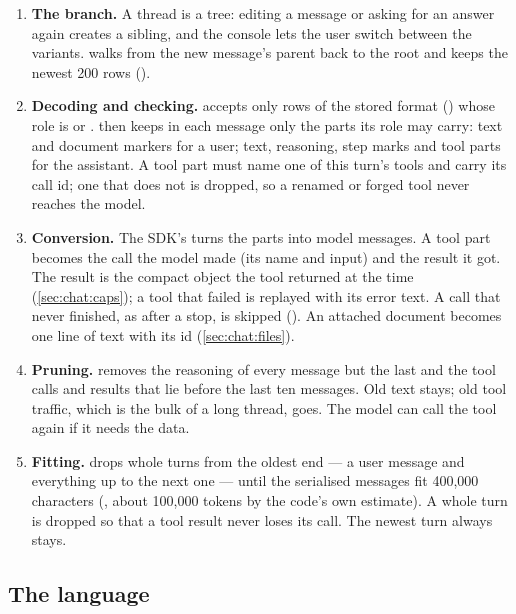 \begin{enumerate}
  \item \textbf{The branch.} A thread is a tree: editing a message or asking for an answer
    again creates a sibling, and the console lets the user switch between the variants.
     walks  from the new message's parent back to the root
    and keeps the newest 200 rows ().
  \item \textbf{Decoding and checking.}  accepts only rows of the stored format
    () whose role is  or . 
    then keeps in each message only the parts its role may carry: text and document markers
    for a user; text, reasoning, step marks and tool parts for the assistant. A tool part must
    name one of this turn's tools and carry its call id; one that does not is dropped, so a
    renamed or forged tool never reaches the model.
  \item \textbf{Conversion.} The SDK's  turns the parts into model
    messages. A tool part becomes the call the model made (its name and input) and the result
    it got. The result is the compact object the tool returned at the time
    (\cref{sec:chat:caps}); a tool that failed is replayed with its error text. A call that
    never finished, as after a stop, is skipped (). An attached
    document becomes one line of text with its id (\cref{sec:chat:files}).
  \item \textbf{Pruning.}  removes the reasoning of every message but the
    last and the tool calls and results that lie before the last ten messages. Old text stays;
    old tool traffic, which is the bulk of a long thread, goes. The model can call the tool
    again if it needs the data.
  \item \textbf{Fitting.}  drops whole turns from the oldest end --- a user
    message and everything up to the next one --- until the serialised messages fit 400,000
    characters (, about 100,000 tokens by the code's own estimate). A
    whole turn is dropped so that a tool result never loses its call. The newest turn always
    stays.
\end{enumerate}

\subsection{The language}\label{sec:chat:language}

